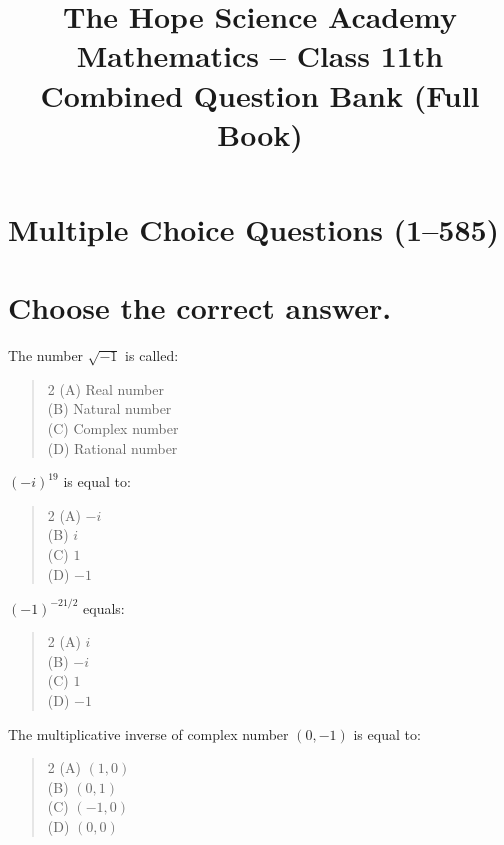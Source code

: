 \documentclass[11pt,a4paper]{article}
\title{\textbf{The Hope Science Academy}\\[2pt]\large Mathematics -- Class 11th\\[2pt]\normalsize Combined Question Bank (Full Book)}
\author{}
\date{}
\begin{document}
\maketitle
\tableofcontents
\newpage

\section{Multiple Choice Questions (1--585)}

\section*{Choose the correct answer.}

\begin{mcqlist}

\item The number $\sqrt{-1}$ is called:
\begin{quote}\begin{multicols}{2}
\noindent (A) Real number \\
(B) Natural number \\
(C) Complex number \\
(D) Rational number
\end{multicols}\end{quote}

\item $(-i)^{19}$ is equal to:
\begin{quote}\begin{multicols}{2}
\noindent (A) $-i$ \\
(B) $i$ \\
(C) $1$ \\
(D) $-1$
\end{multicols}\end{quote}

\item $(-1)^{-21/2}$ equals:
\begin{quote}\begin{multicols}{2}
\noindent (A) $i$ \\
(B) $-i$ \\
(C) $1$ \\
(D) $-1$
\end{multicols}\end{quote}

\item The multiplicative inverse of complex number $(0,-1)$ is equal to:
\begin{quote}\begin{multicols}{2}
\noindent (A) $(1,0)$ \\
(B) $(0,1)$ \\
(C) $(-1,0)$ \\
(D) $(0,0)$
\end{multicols}\end{quote}


\end{mcqlist}
\end{document}
